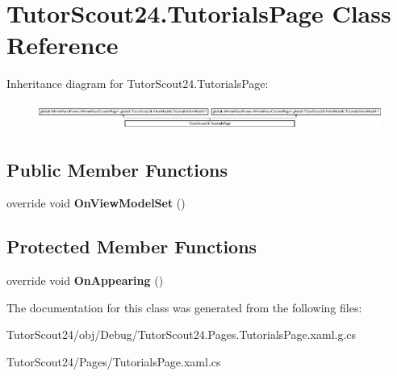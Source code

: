 \hypertarget{class_tutor_scout24_1_1_tutorials_page}{}\section{Tutor\+Scout24.\+Tutorials\+Page Class Reference}
\label{class_tutor_scout24_1_1_tutorials_page}
Inheritance diagram for Tutor\+Scout24.\+Tutorials\+Page\+:\begin{figure}[H]
\begin{center}
\leavevmode
\includegraphics[height=0.891720cm]{class_tutor_scout24_1_1_tutorials_page}
\end{center}
\end{figure}
\subsection*{Public Member Functions}
\begin{DoxyCompactItemize}
\item 
\mbox{\label{class_tutor_scout24_1_1_tutorials_page_a12d3d202e1720b8371d8fbcc582ca5d8}} 
override void {\bfseries On\+View\+Model\+Set} ()
\end{DoxyCompactItemize}
\subsection*{Protected Member Functions}
\begin{DoxyCompactItemize}
\item 
\mbox{\label{class_tutor_scout24_1_1_tutorials_page_a3e5e80dfe3d3e646943918b6e5369be0}} 
override void {\bfseries On\+Appearing} ()
\end{DoxyCompactItemize}


The documentation for this class was generated from the following files\+:\begin{DoxyCompactItemize}
\item 
Tutor\+Scout24/obj/\+Debug/Tutor\+Scout24.\+Pages.\+Tutorials\+Page.\+xaml.\+g.\+cs\item 
Tutor\+Scout24/\+Pages/Tutorials\+Page.\+xaml.\+cs\end{DoxyCompactItemize}
